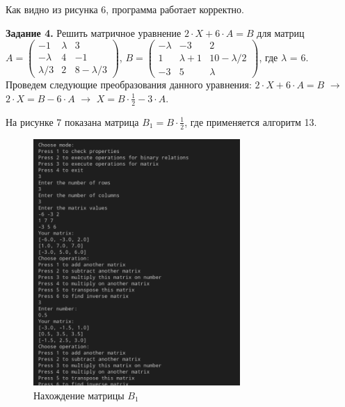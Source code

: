 \documentclass[bachelor, och, labwork]{shiza}
\begin{document}
        Как видно из рисунка 6, программа работает корректно.

        \textbf{Задание 4.} Решить матричное уравнение $2 \cdot X+ 6 \cdot A = B$ для матриц
        $A =
        \begin{pmatrix}
            -1 & \lambda & 3  \\
            -\lambda & 4 & -1 \\
            \lambda / 3 & 2 & 8 - \lambda / 3
        \end{pmatrix}$,
        $B = 
        \begin{pmatrix}
            -\lambda & -3 & 2  \\
            1 & \lambda + 1 & 10 - \lambda / 2 \\
            -3 & 5 & \lambda
        \end{pmatrix}$, где $\lambda$ = 6.\\
    
        Проведем следующие преобразования данного уравнения: $2 \cdot X+ 6 \cdot A = B$ $\rightarrow$ $2 \cdot X= B - 6 \cdot A$
        $\rightarrow$ $X = B \cdot \frac{1}{2} - 3 \cdot A$.

        На рисунке 7 показана матрица $B_1 = B \cdot \frac{1}{2}$, где применяется алгоритм 13.

        \begin{figure}[H]
            \centering
            \includegraphics[width=0.7\textwidth]{photo/7.png}
            \caption{Нахождение матрицы $B_1$}
        \end{figure}
\end{document}
